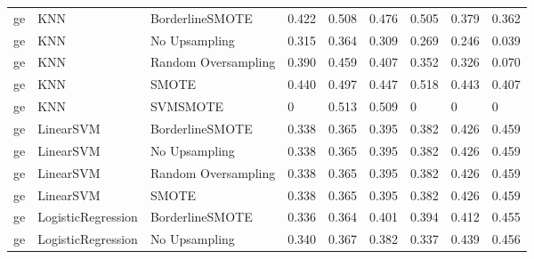 \begin{tabular}{lllllllll}
      ge &                          KNN &     BorderlineSMOTE & 0.422 &                     0.508 &                 0.476 &                  0.505 &                                   0.379 &     0.362 \\
      ge &                          KNN &       No Upsampling & 0.315 &                     0.364 &                 0.309 &                  0.269 &                                   0.246 &     0.039 \\
      ge &                          KNN & Random Oversampling & 0.390 &                     0.459 &                 0.407 &                  0.352 &                                   0.326 &     0.070 \\
      ge &                          KNN &               SMOTE & 0.440 &                     0.497 &                 0.447 &                  0.518 &                                   0.443 &     0.407 \\
      ge &                          KNN &            SVMSMOTE &     0 &                     0.513 &                 0.509 &                      0 &                                       0 &         0 \\
      ge &                    LinearSVM &     BorderlineSMOTE & 0.338 &                     0.365 &                 0.395 &                  0.382 &                                   0.426 &     0.459 \\
      ge &                    LinearSVM &       No Upsampling & 0.338 &                     0.365 &                 0.395 &                  0.382 &                                   0.426 &     0.459 \\
      ge &                    LinearSVM & Random Oversampling & 0.338 &                     0.365 &                 0.395 &                  0.382 &                                   0.426 &     0.459 \\
      ge &                    LinearSVM &               SMOTE & 0.338 &                     0.365 &                 0.395 &                  0.382 &                                   0.426 &     0.459 \\
      ge &           LogisticRegression &     BorderlineSMOTE & 0.336 &                     0.364 &                 0.401 &                  0.394 &                                   0.412 &     0.455 \\
      ge &           LogisticRegression &       No Upsampling & 0.340 &                     0.367 &                 0.382 &                  0.337 &                                   0.439 &     0.456 \\

\end{tabular}
